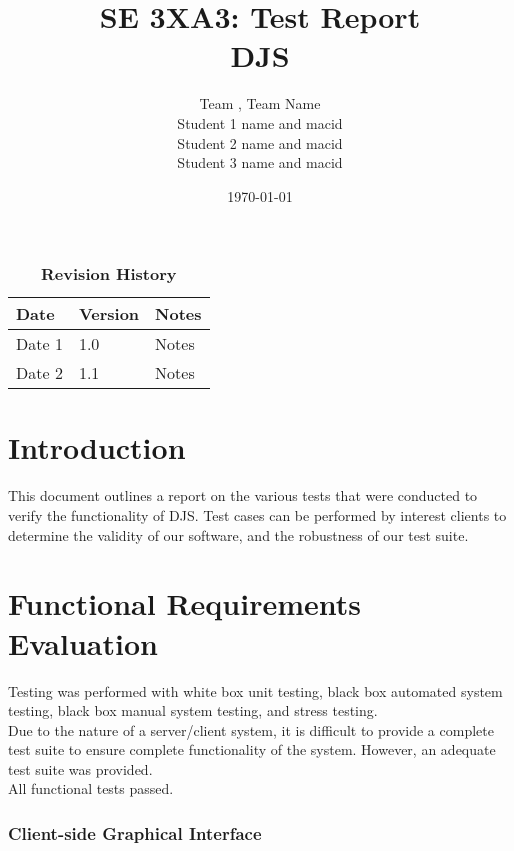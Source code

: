 \documentclass[12pt, titlepage]{article}
\title{SE 3XA3: Test Report\\DJS}
\author{Team , Team Name
		\\ Student 1 name and macid
		\\ Student 2 name and macid
		\\ Student 3 name and macid
}
\date{\today}
\begin{document}
\maketitle

\tableofcontents
\listoftables
\listoffigures

\begin{table}[H]
\caption{\bf Revision History}
\begin{tabularx}{\textwidth}{p{3cm}p{2cm}X}
\toprule {\bf Date} & {\bf Version} & {\bf Notes}\\
\midrule
Date 1 & 1.0 & Notes\\
Date 2 & 1.1 & Notes\\
\bottomrule
\end{tabularx}
\end{table}

\newpage


\section{Introduction}

This document outlines a report on the various tests that were conducted to verify the functionality of DJS. Test cases can be performed by interest clients to determine the validity of our software, and the robustness of our test suite.

\section{Functional Requirements Evaluation}
Testing was performed with white box unit testing, black box automated system testing, black box manual system testing, and stress testing.\\


Due to the nature of a server/client system, it is difficult to provide a complete test suite to ensure complete functionality of the system. However, an adequate test suite was provided. \\


All functional tests passed.


\subsubsection{Client-side Graphical Interface}
\end{document}
